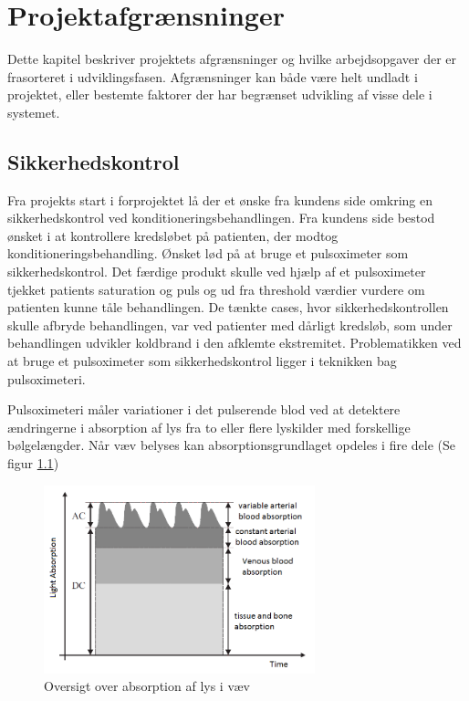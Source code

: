 \chapter{Projektafgrænsninger}
Dette kapitel beskriver projektets afgrænsninger og hvilke arbejdsopgaver der er frasorteret i udviklingsfasen. Afgrænsninger kan både være helt undladt i projektet, eller bestemte faktorer der har begrænset udvikling af visse dele i systemet. 

\section{Sikkerhedskontrol} \label{title:sikkerhedskontrol}
Fra projekts start i forprojektet lå der et ønske fra kundens side omkring en sikkerhedskontrol ved konditioneringsbehandlingen. Fra kundens side bestod ønsket i at kontrollere kredsløbet på patienten, der modtog konditioneringsbehandling. Ønsket lød på at bruge et pulsoximeter som sikkerhedskontrol. Det færdige produkt skulle ved hjælp af et pulsoximeter tjekket patients saturation og puls og ud fra threshold værdier vurdere om patienten kunne tåle behandlingen. De tænkte cases, hvor sikkerhedskontrollen skulle afbryde behandlingen, var ved patienter med dårligt kredsløb, som under behandlingen udvikler koldbrand i den afklemte ekstremitet. Problematikken ved at bruge et pulsoximeter som sikkerhedskontrol ligger i teknikken bag pulsoximeteri. 

Pulsoximeteri måler variationer i det pulserende blod ved at detektere ændringerne i absorption af lys fra to eller flere lyskilder med forskellige bølgelængder. Når væv belyses kan absorptionsgrundlaget opdeles i fire dele (Se figur \ref{fig:opticTissue})
\begin{figure}[H]
	\centering
	\includegraphics[width = 0.7\textwidth]{billeder/opticTissue.png}
	\caption{Oversigt over absorption af lys i væv}\label{fig:opticTissue}
\end{figure}

